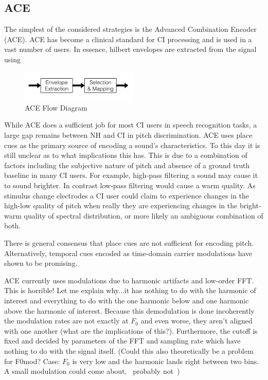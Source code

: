 \documentclass [11pt, proquest] {uwthesis}[2015/03/03]
\begin{document}
\subsection{ACE}

The simplest of the considered strategies is the Advanced Combination Encoder (ACE).  ACE has become a clinical standard for CI processing and is used in a vast number of users.  In essence, hilbert envelopes are extracted from the signal using 

\begin{figure}[!ht]
  \centering
    \includegraphics[width=0.5\textwidth]{ACE_flow_diagramTEMP}   
    \caption{ACE Flow Diagram}
\end{figure}

While ACE does a sufficient job for most CI users in speech recognition tasks, a large gap remains between NH and CI in pitch discrimination.  ACE uses place cues as the primary source of encoding a sound's characteristics.  To this day it is still unclear as to what implications this has.  This is due to a combination of factors including the subjective nature of pitch and absence of a ground truth baseline in many CI users.  For example, high-pass filtering a sound may cause it to sound brighter.  In contrast low-pass filtering would cause a warm quality.  As stimulus change electrodes a CI user could claim to experience changes in the high-low quality of pitch when really they are experiencing changes in the bright-warm quality of spectral distribution, or more likely an ambiguous combination of both.

There is general consensus that place cues are not sufficient for encoding pitch.  Alternatively, temporal cues encoded as time-domain carrier modulations have shown to be promising.

ACE currently uses modulations due to harmonic artifacts and low-order FFT.  This is horrible!  Let me explain why...it has nothing to do with the harmonic of interest and everything to do with the one harmonic below and one harmonic above the harmonic of interest.  Because this demodulation is done incoherently the modulation rates are not exactly at $F_0$ and even worse, they aren't aligned with one another (what are the implications of this?).  Furthermore, the cutoff is fixed and decided by parameters of the FFT and sampling rate which have nothing to do with the signal itself.  (Could this also theoretically be a problem for F0mod?  Case: $F_0$ is very low and the harmonic lands right between two bins.  A small modulation could come about, ~probably not~)
\end{document}

